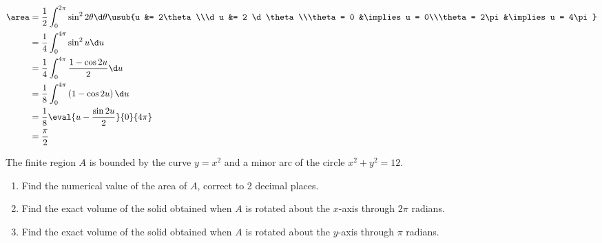 \documentclass{jhwhw}
\begin{document}
    \solution
        \begin{align*}
            \area &= \dfrac12 \int_0^{2\pi} \sin^2 2\theta \d \theta \usub{u &= 2\theta\\\d u &= 2 \d \theta\\\theta = 0 &\implies u = 0\\\theta = 2\pi &\implies u = 4\pi}\\
            &= \dfrac14 \int_0^{4\pi} \sin^2 u \d u\\
            &= \dfrac14 \int_0^{4\pi} \dfrac{1 - \cos 2u}2 \d u\\
            &= \dfrac18 \int_0^{4\pi} \left(1 - \cos 2u\right) \d u\\
            &= \dfrac18 \eval{u - \dfrac{\sin 2u}2}{0}{4\pi}\\
            &= \dfrac\pi2
        \end{align*}


    \problem{}
        The finite region $A$ is bounded by the curve $y = x^2$ and a minor arc of the circle $x^2 + y^2 = 12$.

        \begin{enumerate}
            \item Find the numerical value of the area of $A$, correct to 2 decimal places.
            \item Find the exact volume of the solid obtained when $A$ is rotated about the $x$-axis through $2\pi$ radians.
            \item Find the exact volume of the solid obtained when $A$ is rotated about the $y$-axis through $\pi$ radians.
        \end{enumerate}
\end{document}
